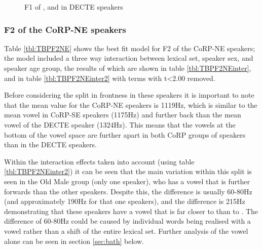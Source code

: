 \documentclass[../../../00.FullDoc/tex/APRReport-year4]{subfiles}
\begin{document}
\begin{figure}[h]
	
	\caption{F1 of \trap{}, \bath{} and \palm{} in DECTE speakers} \label{fig:TF1NE}
\end{figure}

\subsubsection{F2 of the CoRP-NE speakers}
Table \ref{tbl:TBPF2NE}  shows the best fit model for F2 of the CoRP-NE speakers; the model included a three way interaction between lexical set, speaker sex, and speaker age group, the results of which are shown in table \ref{tbl:TBPF2NEinter}, and in table \ref{tbl:TBPF2NEinter2} with terms with t<2.00 removed.

Before considering the split in frontness in these speakers it is important to note that the mean \palm{} value for the CoRP-NE speakers is 1119Hz, which is similar to the mean \palm{} vowel in CoRP-SE speakers (1175Hz) and further back than the mean \palm{} vowel of the DECTE speaker (1324Hz). This means that the vowels at the bottom of the vowel space are further apart in both CoRP groups of speakers than in the DECTE speakers. 

Within the interaction effects taken into account (using table \ref{tbl:TBPF2NEinter2}) it can be seen that the main variation within this split is seen in the Old Male group (only one speaker), who has a \trap{} vowel that is further forwards than the other speakers. Despite this, the \TB{} difference is usually 60-80Hz (and approximately 190Hz for that one speakers), and the \PB{} difference is 215Hz demonstrating that these speakers have a \bath{} vowel that is far closer to \trap{}than to \palm{}. The difference of 60-80Hz could be caused by individual \bath{} words being realised with a \palm{} vowel rather than a shift of the entire lexical set. Further analysis of the \bath{} vowel alone can be seen in section \ref{sec:bath} below.
\end{document}
